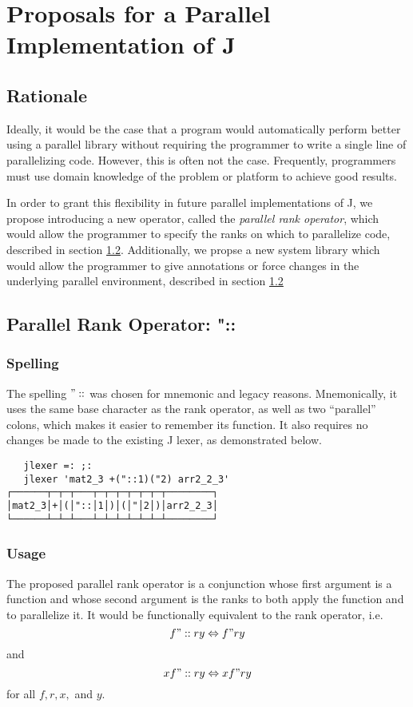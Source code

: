 \chapter{Proposals for a Parallel Implementation of J} %

\section{Rationale}
Ideally, it would be the case that a program would automatically perform better using a parallel library 
without requiring the programmer to write a single line of parallelizing code. 
However, this is often not the case. %
Frequently, programmers must use domain knowledge of the problem or platform to achieve good results. 

In order to grant this flexibility in future parallel implementations of J, 
we propose introducing a new operator, called the \textit{parallel rank operator}, 
which would allow the programmer to specify the ranks on which to parallelize code, 
described in section \ref{prank}.
Additionally, we propse a new system library
which would allow the programmer to give annotations or force changes in the underlying parallel environment,
described in section \ref{prank}

\section{Parallel Rank Operator: "::}
\label{prank}

\subsection{Spelling}
The spelling $"::$ was chosen for mnemonic and legacy reasons. 
Mnemonically, it uses the same base character as the rank operator, 
as well as two ``parallel'' colons, which makes it easier to remember its function.
It also requires no changes be made to the existing J lexer\cite{ioj}, 
as demonstrated below.

\begin{verbatim}
   jlexer =: ;:
   jlexer 'mat2_3 +("::1)("2) arr2_2_3'
┌──────┬─┬─┬───┬─┬─┬─┬─┬─┬─┬────────┐
│mat2_3│+│(│"::│1│)│(│"│2│)│arr2_2_3│
└──────┴─┴─┴───┴─┴─┴─┴─┴─┴─┴────────┘
\end{verbatim}

\subsection{Usage}
The proposed parallel rank operator is a conjunction 
whose first argument is a function 
and whose second argument is the ranks to both apply the function and to parallelize it. 
It would be functionally equivalent to the rank operator, i.e. 
\[f"::r y \Leftrightarrow f"r y\] and \[x f"::r y \Leftrightarrow x f"r y\] for all $f, r, x,$ and $y$.

